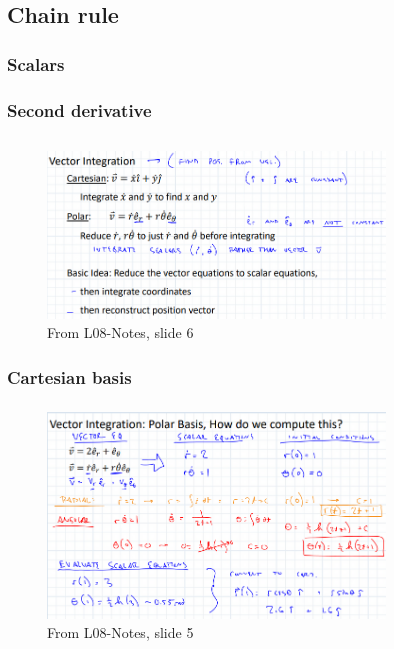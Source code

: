 \subsection{Chain rule}
    \subsubsection{Scalars}
    \subsubsection{Second derivative}
    
\subsection{}
\begin{figure}[h!]
    \centering \includegraphics[width=0.8\textwidth]{VectorCalculusFigures/SummaryVectorIntegration.png}
    \caption{From L08-Notes, slide 6}
    \label{fig:SummaryVecInt}
\end{figure}
    \subsubsection{Cartesian basis}
    \subsubsection{}
    
    \begin{figure}[h!]
        \centering \includegraphics[width=0.8\textwidth]{VectorCalculusFigures/PolarIntegration.png}
        \caption{From L08-Notes, slide 5} \label{fig:PolarIntegration}
    \end{figure}

